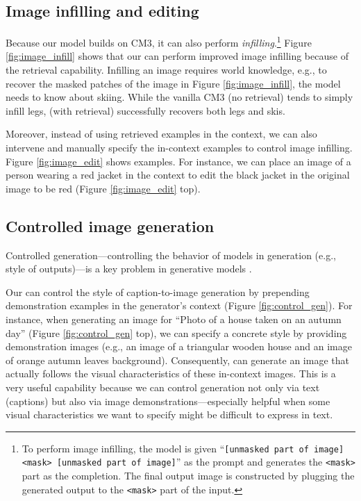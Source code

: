 \subsection{Image infilling and editing}
\label{sec:result-image_infill}

Because our model builds on CM3, it can also perform \textit{infilling}.\footnote{To perform image infilling, the model is given ``\texttt{[unmasked part of image] <mask> [unmasked part of image]}'' as the prompt and generates the \texttt{<mask>} part as the completion. The final output image is constructed by plugging the generated output to the \texttt{<mask>} part of the input.} Figure \ref{fig:image_infill} shows that our \methodname can perform improved image infilling because of the retrieval capability. Infilling an image requires world knowledge, e.g., to recover the masked patches of the image in Figure \ref{fig:image_infill}, the model needs to know about skiing. While the vanilla CM3 (no retrieval) tends to simply infill legs, \methodname (with retrieval) successfully recovers both legs and skis. 

Moreover, instead of using retrieved examples in the \methodname context, we can also intervene and manually specify the in-context examples to control image infilling. Figure \ref{fig:image_edit} shows examples. For instance, we can place an image of a person wearing a red jacket in the context to edit the black jacket in the original image to be red (Figure \ref{fig:image_edit} top).


\subsection{Controlled image generation}
\label{sec:result-controlled}

Controlled generation---controlling the behavior of models in generation (e.g., style of outputs)---is a key problem in generative models \cite{keskar2019ctrl, li2019controllable}.

Our \methodname can control the style of caption-to-image generation by prepending demonstration examples in the generator's context (Figure \ref{fig:control_gen}).
For instance, when generating an image for ``Photo of a house taken on an autumn day'' (Figure \ref{fig:control_gen} top), we can specify a concrete style by providing demonstration images (e.g., an image of a triangular wooden house and an image of orange autumn leaves background). Consequently, \methodname can generate an image that actually follows the visual characteristics of these in-context images. 
This is a very useful capability because we can control generation not only via text (captions) but also via image demonstrations---especially helpful when some visual characteristics we want to specify might be difficult to express in text.

